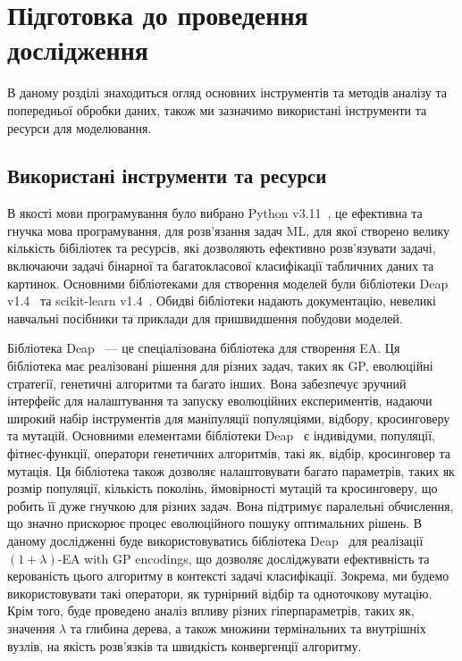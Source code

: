 \chapter{Підготовка до проведення дослідження}
\label{chap:theory}

В даному розділі знаходиться огляд основних інструментів та методів аналізу та попередньої обробки даних, також ми зазначимо використані інструменти та ресурси для моделювання.

\section{Використані інструменти та ресурси}

В якості мови програмування було вибрано Python v3.11~\cite{ct18}, це ефективна та гнучка мова програмування, для розв'язання задач ML, для якої створено велику кількість бібіліотек та ресурсів, які дозволяють ефективно розв'язувати задачі, включаючи задачі бінарної та багатокласової класифікації табличних даних та картинок. Основними бібліотеками для створення моделей були бібліотеки Deap v1.4~\cite{ct19} та scikit-learn v1.4~\cite{ct20}. Обидві бібліотеки надають документацію, невеликі навчальні посібники та приклади для пришвидшення побудови моделей.

Бібліотека Deap~\cite{ct19} --- це спеціалізована бібліотека для створення EA. Ця бібліотека має реалізовані рішення для різних задач, таких як GP, еволюційні стратегії, генетичні алгоритми та багато інших. Вона забезпечує зручний інтерфейс для налаштування та запуску еволюційних експериментів, надаючи широкий набір інструментів для маніпуляції популяціями, відбору, кросинговеру та мутацій. Основними елементами бібліотеки Deap~\cite{ct19} є індивідуми, популяції, фітнес-функції, оператори генетичних алгоритмів, такі як, відбір, кросинговер та мутація. Ця бібліотека також дозволяє налаштовувати багато параметрів, таких як розмір популяції, кількість поколінь, ймовірності мутацій та кросинговеру, що робить її дуже гнучкою для різних задач. Вона підтримує паралельні обчислення, що значно прискорює процес еволюційного пошуку оптимальних рішень. В даному дослідженні буде використовуватись бібліотека Deap~\cite{ct19} для реалізації $(1+\lambda)$-EA with GP encodings, що дозволяє досліджувати ефективність та керованість цього алгоритму в контексті задачі класифікації. Зокрема, ми будемо використовувати такі оператори, як турнірний відбір та одноточкову мутацію. Крім того, буде проведено аналіз впливу різних гіперпараметрів, таких як, значення $\lambda$ та глибина дерева, а також множини термінальних та внутрішніх вузлів, на якість розв'язків та швидкість конвергенції алгоритму.

